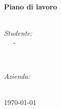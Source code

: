 \begin{titlepage}
    \HRule \\[0.4cm]
    { \huge \bfseries Piano di lavoro}\\[0.4cm] %
    \HRule \\[1.5cm]
    
    
    \vspace{1.5cm}
    
    \begin{minipage}{0.4\textwidth}
        \begin{flushleft} \large
            \emph{Studente:}\\
            \nomeStudente\ \textsc{\cognomeStudente\ } - \matricolaStudente
        \end{flushleft}
    \end{minipage}
    ~
    \begin{minipage}{0.4\textwidth}
        \begin{flushright} \large
            \emph{Azienda:} \\
            \ragioneSocAzienda
        \end{flushright}
    \end{minipage}\\[2cm]
    
    
    {\large \today}\\[2cm]
    
    
    \vfill 
    
\end{titlepage}